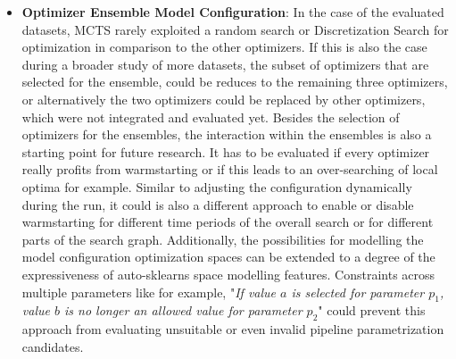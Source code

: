 \begin{itemize}
    \item \textbf{Optimizer Ensemble Model Configuration}: In the case of the evaluated datasets, MCTS rarely exploited a random search or Discretization Search for optimization in comparison to the other optimizers.
    If this is also the case during a broader study of more datasets, the subset of optimizers that are selected for the ensemble, could be reduces to the remaining three optimizers, or alternatively the two optimizers could be replaced by other optimizers, which were not integrated and evaluated yet.\newline
    Besides the selection of optimizers for the ensembles, the interaction within the ensembles is also a starting point for future research.
    It has to be evaluated if every optimizer really profits from warmstarting or if this leads to an over-searching of local optima for example.
    Similar to adjusting the configuration dynamically during the run, it could is also a different approach to enable or disable warmstarting for different time periods of the overall search or for different parts of the search graph.\newline
    Additionally, the possibilities for modelling the model configuration optimization spaces can be extended to a degree of the expressiveness of auto-sklearns space modelling features.
    Constraints across multiple parameters like for example, "\textit{If value $a$ is selected for parameter $p_1$, value $b$ is no longer an allowed value for parameter $p_2$}" could prevent this approach from evaluating unsuitable or even invalid pipeline parametrization candidates.
\end{itemize}

